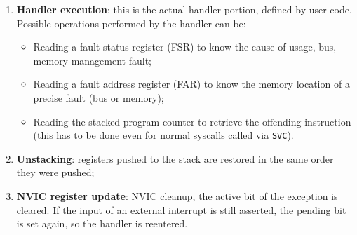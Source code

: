 \documentclass[a4paper,11pt]{article}
\begin{document}
\begin{enumerate}
\begin{itemize}
		            It is laid out as follows:
		            \begin{itemize}
			            \item Bit 0: processor state. 0 -> ARM, 1 -> Thumb
			            \item Bit 1: reserved, it must be 0
			            \item Bit 2: return stack. 0 -> MSP, 1 -> PSP
			            \item Bit 3: return mode. 0 -> handler, 1 -> thread
			            \item Bits 4-31: each bit must be 1
		            \end{itemize}

		            In practice, the allowed values of \texttt{EXC\_RETURN} are:
		            \begin{itemize}
			            \item \texttt{0xFFFFFFF1}: return to handler mode;
			            \item \texttt{0xFFFFFFF9}: return to thread mode with MSP;
			            \item \texttt{0xFFFFFFFD}: return to thread mode with PSP.
		            \end{itemize}

		      \item Some NVIC registers: pending status of exception is cleared, active bit of exception is set.
	      \end{itemize}

	\item \textbf{Handler execution}: this is the actual handler portion, defined by user code. Possible operations performed by the handler can be:
	      \begin{itemize}
		      \item Reading a fault status register (FSR) to know the cause of usage, bus, memory management fault;
		      \item Reading a fault address register (FAR) to know the memory location of a precise fault (bus or memory);
		      \item Reading the stacked program counter to retrieve the offending instruction (this has to be done even for normal syscalls called via \texttt{SVC}).
	      \end{itemize}
	\item \textbf{Unstacking}: registers pushed to the stack are restored in the same order they were pushed;
	\item \textbf{NVIC register update}: NVIC cleanup, the active bit of the exception is cleared. If the input of an external interrupt is still asserted, the pending bit is set again, so the handler is reentered.
\end{enumerate}
\end{document}
